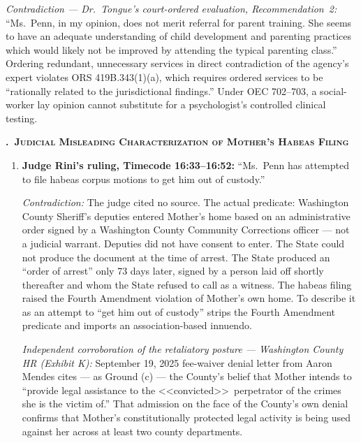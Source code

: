 \documentclass[10pt,a4paper,roman]{moderncv}
\newcounter{legalsection}
\newcounter{legalsubsection}[legalsection]
\renewcommand{\thelegalsubsection}{\Alph{legalsubsection}}
\newcommand{\legalsubsection}[1]{%
	\refstepcounter{legalsubsection}%
	\par\addvspace{0.85em}%
	{\color{inkblue}\normalfont\normalsize\bfseries\scshape
		\thelegalsubsection.\hspace{0.45em}#1\par}%
	\vspace{0.2em}%
}
\begin{document}
\begin{enumerate}[leftmargin=*,itemsep=0.35em,topsep=0.3em,resume]
\begin{enumerate}[leftmargin=*,itemsep=0.35em,topsep=0.3em,resume]
	\emph{Contradiction --- Dr.~Tongue's court-ordered evaluation, Recommendation~2:} ``Ms.~Penn, in my opinion, does not merit referral for parent training. She seems to have an adequate understanding of child development and parenting practices which would likely not be improved by attending the typical parenting class.'' Ordering redundant, unnecessary services in direct contradiction of the agency's expert violates ORS 419B.343(1)(a), which requires ordered services to be ``rationally related to the jurisdictional findings.'' Under OEC 702--703, a social-worker lay opinion cannot substitute for a psychologist's controlled clinical testing.
\end{enumerate}

\legalsubsection{~Judicial Misleading Characterization of Mother's Habeas Filing}

\begin{enumerate}[leftmargin=*,itemsep=0.35em,topsep=0.3em,resume]
	\item \textbf{Judge Rini's ruling, Timecode 16:33--16:52:} ``Ms.~Penn has attempted to file habeas corpus motions to get him out of custody.''
	
	\emph{Contradiction:} The judge cited no source. The actual predicate: Washington County Sheriff's deputies entered Mother's home based on an administrative order signed by a Washington County Community Corrections officer --- not a judicial warrant. Deputies did not have consent to enter. The State could not produce the document at the time of arrest. The State produced an ``order of arrest'' only 73 days later, signed by a person laid off shortly thereafter and whom the State refused to call as a witness. The habeas filing raised the Fourth Amendment violation of Mother's own home. To describe it as an attempt to ``get him out of custody'' strips the Fourth Amendment predicate and imports an association-based innuendo.
	
	\emph{Independent corroboration of the retaliatory posture --- Washington County HR (Exhibit K):} September 19, 2025 fee-waiver denial letter from Aaron Mendes cites --- as Ground (c) --- the County's belief that Mother intends to ``provide legal assistance to the \textless\textless convicted\textgreater\textgreater\ perpetrator of the crimes she is the victim of.'' That admission on the face of the County's own denial confirms that Mother's constitutionally protected legal activity is being used against her across at least two county departments.
\end{enumerate}


\end{enumerate}
\end{document}
